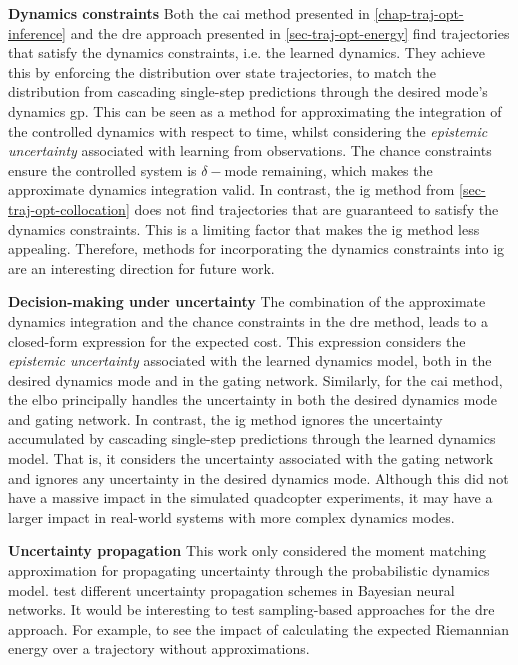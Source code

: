 \documentclass{mimosis-class/mimosis}
\numberwithin{equation}{chapter}
\begin{document}
{\textbf{Dynamics constraints}
Both the \acrshort{cai} method presented in \cref{chap-traj-opt-inference}
and the \acrshort{dre} approach presented in
\cref{sec-traj-opt-energy} find trajectories that satisfy the dynamics constraints, i.e. the learned dynamics.
They achieve this by enforcing the distribution over state trajectories,
to match the distribution from cascading single-step predictions through the desired mode's dynamics \acrshort{gp}.
This can be seen as a method for approximating the integration of the controlled dynamics with respect to time, whilst
considering the \emph{epistemic uncertainty} associated with learning from observations.
The chance constraints ensure the controlled system is \(\delta-\text{mode remaining}\), which
makes the approximate dynamics integration valid.
In contrast, the \acrshort{ig} method from \cref{sec-traj-opt-collocation} does not find trajectories that are
guaranteed to satisfy the dynamics constraints.
This is a limiting factor that makes the \acrshort{ig} method less appealing.
Therefore, methods for incorporating the dynamics constraints into \acrshort{ig} are an interesting
direction for future work.


\textbf{Decision-making under uncertainty}
The combination of the approximate dynamics integration and the chance constraints
in the \acrshort{dre} method, leads to a closed-form expression for the expected cost.
This expression considers the \emph{epistemic uncertainty} associated with the learned dynamics model,
both in the desired dynamics mode and in the gating network.
Similarly, for the \acrshort{cai} method, the \acrshort{elbo} principally handles the uncertainty
in both the desired dynamics mode and gating network.
In contrast, the \acrshort{ig} method ignores the uncertainty accumulated by cascading single-step predictions through
the learned dynamics model.
That is, it considers the uncertainty associated with the gating network and ignores any uncertainty
in the desired dynamics mode.
Although this did not have a massive impact in the simulated quadcopter experiments, it may have a
larger impact in real-world systems with more complex dynamics modes.

\textbf{Uncertainty propagation}
This work only considered the moment matching approximation for propagating uncertainty through the probabilistic
dynamics model.
\cite{chuaDeep2018} test different uncertainty propagation schemes in Bayesian neural networks.
It would be interesting to test sampling-based approaches for the \acrshort{dre} approach.
For example, to see the impact of calculating the expected Riemannian energy over a trajectory without approximations.


}
\end{document}
